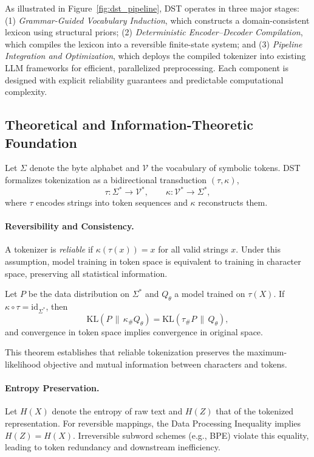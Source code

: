 As illustrated in Figure~\ref{fig:dst_pipeline}, DST operates in three major stages:
(1) \emph{Grammar-Guided Vocabulary Induction}, which constructs a domain-consistent lexicon using structural priors;
(2) \emph{Deterministic Encoder–Decoder Compilation}, which compiles the lexicon into a reversible finite-state system;
and (3) \emph{Pipeline Integration and Optimization}, which deploys the compiled tokenizer into existing LLM frameworks for efficient, parallelized preprocessing.
Each component is designed with explicit reliability guarantees and predictable computational complexity.

\subsection{Theoretical and Information-Theoretic Foundation}
Let $\Sigma$ denote the byte alphabet and $\mathcal{V}$ the vocabulary of symbolic tokens.
DST formalizes tokenization as a bidirectional transduction $(\tau, \kappa)$,
\[
\tau: \Sigma^* \to \mathcal{V}^*, \qquad
\kappa: \mathcal{V}^* \to \Sigma^*,
\]
where $\tau$ encodes strings into token sequences and $\kappa$ reconstructs them.

\paragraph{Reversibility and Consistency.}
A tokenizer is \emph{reliable} if $\kappa(\tau(x))=x$ for all valid strings $x$.
Under this assumption, model training in token space is equivalent to training in character space, preserving all statistical information.

\begin{theorem}
Let $P$ be the data distribution on $\Sigma^*$ and $Q_\theta$ a model trained on $\tau(X)$.
If $\kappa\!\circ\!\tau = \mathrm{id}_{\Sigma^*}$, then
\[
\mathrm{KL}(P\,\|\,\kappa_{\#}Q_\theta)
 = \mathrm{KL}(\tau_{\#}P\,\|\,Q_\theta),
\]
and convergence in token space implies convergence in original space.
\end{theorem}

This theorem establishes that reliable tokenization preserves the maximum-likelihood objective and mutual information between characters and tokens.

\paragraph{Entropy Preservation.}
Let $H(X)$ denote the entropy of raw text and $H(Z)$ that of the tokenized representation.
For reversible mappings, the Data Processing Inequality implies $H(Z)=H(X)$.
Irreversible subword schemes (e.g., BPE) violate this equality, leading to token redundancy and downstream inefficiency.

